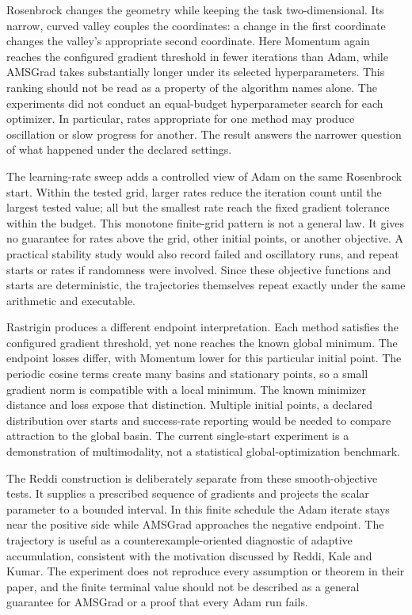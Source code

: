\documentclass[conference]{IEEEtran}
\begin{document}
Rosenbrock changes the geometry while keeping the task two-dimensional. Its narrow, curved valley couples the coordinates: a change in the first coordinate changes the valley's appropriate second coordinate. Here Momentum again reaches the configured gradient threshold in fewer iterations than Adam, while AMSGrad takes substantially longer under its selected hyperparameters. This ranking should not be read as a property of the algorithm names alone. The experiments did not conduct an equal-budget hyperparameter search for each optimizer. In particular, rates appropriate for one method may produce oscillation or slow progress for another. The result answers the narrower question of what happened under the declared settings.

The learning-rate sweep adds a controlled view of Adam on the same Rosenbrock start. Within the tested grid, larger rates reduce the iteration count until the largest tested value; all but the smallest rate reach the fixed gradient tolerance within the budget. This monotone finite-grid pattern is not a general law. It gives no guarantee for rates above the grid, other initial points, or another objective. A practical stability study would also record failed and oscillatory runs, and repeat starts or rates if randomness were involved. Since these objective functions and starts are deterministic, the trajectories themselves repeat exactly under the same arithmetic and executable.

Rastrigin produces a different endpoint interpretation. Each method satisfies the configured gradient threshold, yet none reaches the known global minimum. The endpoint losses differ, with Momentum lower for this particular initial point. The periodic cosine terms create many basins and stationary points, so a small gradient norm is compatible with a local minimum. The known minimizer distance and loss expose that distinction. Multiple initial points, a declared distribution over starts and success-rate reporting would be needed to compare attraction to the global basin. The current single-start experiment is a demonstration of multimodality, not a statistical global-optimization benchmark.

The Reddi construction is deliberately separate from these smooth-objective tests. It supplies a prescribed sequence of gradients and projects the scalar parameter to a bounded interval. In this finite schedule the Adam iterate stays near the positive side while AMSGrad approaches the negative endpoint. The trajectory is useful as a counterexample-oriented diagnostic of adaptive accumulation, consistent with the motivation discussed by Reddi, Kale and Kumar. The experiment does not reproduce every assumption or theorem in their paper, and the finite terminal value should not be described as a general guarantee for AMSGrad or a proof that every Adam run fails.
\end{document}
